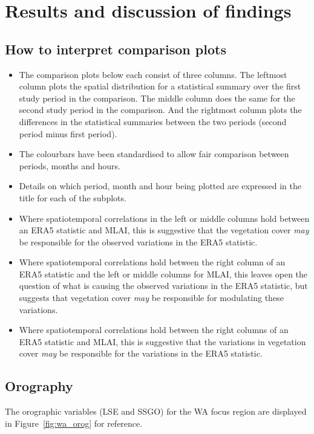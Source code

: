\chapter{Results and discussion of findings}
\label{ch:results}

\section{How to interpret comparison plots}

\begin{itemize}
	\item The comparison plots below each consist of three columns. The leftmost column plots the spatial distribution for a statistical summary over the first study period in the comparison. The middle column does the same for the second study period in the comparison. And the rightmost column plots the differences in the statistical summaries between the two periods (second period minus first period).
	\item The colourbars have been standardised to allow fair comparison between periods, months and hours.
	\item Details on which period, month and hour being plotted are expressed in the title for each of the subplots.
	\item Where spatiotemporal correlations in the left or middle columns hold between an ERA5 statistic and MLAI, this is suggestive that the vegetation cover \textit{may} be responsible for the observed variations in the ERA5 statistic.
	\item Where spatiotemporal correlations hold between the right column of an ERA5 statistic and the left or middle columns for MLAI, this leaves open the question of what is causing the observed variations in the ERA5 statistic, but suggests that vegetation cover \textit{may} be responsible for modulating these variations.
	\item Where spatiotemporal correlations hold between the right columns of an ERA5 statistic and MLAI, this is suggestive that the variations in vegetation cover \textit{may} be responsible for the variations in the ERA5 statistic.
\end{itemize}

\section{Orography}

The orographic variables (\ac{LSE} and \ac{SSGO}) for the \ac{WA} focus region are displayed in Figure~\ref{fig:wa_orog} for reference.

